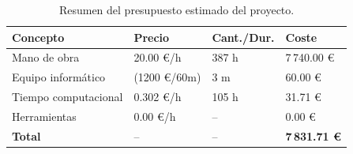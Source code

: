 \begin{table}[H]
    \centering
    \renewcommand{\arraystretch}{1.3}
    \begin{tabular}{p{2.4cm} p{2.1cm} p{2.1cm} p{2.1cm}}
        \hline
        \textbf{Concepto} & \textbf{Precio}      & \textbf{Cant./Dur.} & \textbf{Coste} \\
        \hline

        Mano de obra
                          & 20.00 €/h
                          & 387 h
                          & 7\,740.00 €                                                 \\

        Equipo informático
                          & (1200 €/60m)
                          & 3 m
                          & 60.00 €                                                     \\

        Tiempo computacional
                          & 0.302 €/h
                          & 105 h
                          & 31.71 €                                                     \\

        Herramientas
                          & 0.00 €/h
                          & --
                          & 0.00 €                                                      \\
        \hline

        \textbf{Total}
                          & --
                          & --
                          & \textbf{7\,831.71 €}                                        \\
        \hline
    \end{tabular}
    \caption{Resumen del presupuesto estimado del proyecto.}
    \label{tab:presupuesto}
\end{table}
